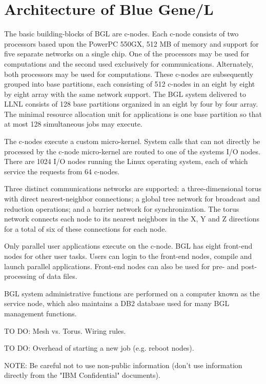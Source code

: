 \documentclass[10pt,onecolumn,times]{../common/llncs}
\begin{document}
{\section{Architecture of Blue Gene/L}

The basic building-blocks of BGL are c-nodes.
Each c-node consists
of two processors based upon the PowerPC 550GX, 512 MB of memory
and support for five separate networks on a single chip.
One of the processors may be used for computations and the
second used exclusively for communications.
Alternately, both processors may be used for computations.
These c-nodes are subsequently grouped into base partitions, each consisting
of 512 c-nodes in an eight by eight by eight array with the same
network support.
The BGL system delivered to LLNL consists of 128 base
partitions organized in an eight by four by four array.
The minimal resource allocation unit for applications is one
base partition so that at most 128 simultaneous jobs may execute.

The c-nodes execute a custom micro-kernel.
System calls that can not directly be processed by the c-node
micro-kernel are routed to one of the systems I/O nodes.
There are 1024 I/O nodes running the Linux operating system,
each of which service the requests from 64 c-nodes.

Three distinct communications networks are supported:
a three-dimensional torus with direct nearest-neighbor connections;
a global tree network for broadcast and reduction operations; and
a barrier network for synchronization.
The torus network connects each node to
its nearest neighbors in the X, Y and Z directions for a
total of six of these connections for each node.

Only parallel user applications execute on the c-node.
BGL has eight front-end nodes for other user tasks.
Users can login to the front-end nodes, compile and
launch parallel applications. Front-end nodes can also
be used for pre- and post-processing of data files.

BGL system administrative functions are performed on a
computer known as the service node, which also maintains
a DB2 database used for many BGL management functions.

TO DO: Mesh vs. Torus.  Wiring rules.

TO DO: Overhead of starting a new job (e.g. reboot nodes).

NOTE: Be careful not to use non-public information (don't use
information directly from the "IBM Confidential" documents).

}
\end{document}
